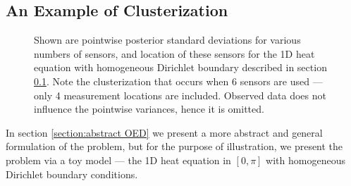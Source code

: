 \documentclass{amsart}
\numberwithin{equation}{section}
\begin{document}
\subsection{An Example of Clusterization}\label{subsec:example}
\begin{figure}
  \caption{Shown are pointwise posterior standard deviations for
    various numbers of sensors, and location of these sensors for the
    1D heat equation with homogeneous Dirichlet boundary described in
    section \ref{subsec:example}. Note the clusterization that occurs
    when 6 sensors are used --- only 4 measurement locations are
    included. Observed data does not influence the pointwise
    variances, hence it is omitted.}
\end{figure}\label{fig:clusterization illustration}
In section \ref{section:abstract OED} we present a more abstract and
general formulation of the problem, but for the purpose of
illustration, we present the problem via a toy model --- the 1D heat
equation in $[0,\pi]$ with homogeneous Dirichlet boundary
conditions.
\end{document}
